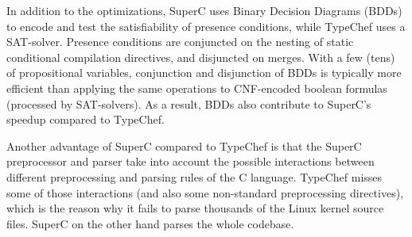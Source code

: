 \documentclass[11pt]{article}
\begin{document}
In addition to the optimizations, SuperC uses Binary Decision Diagrams (BDDs) to encode and test the satisfiability of presence conditions, while TypeChef uses a SAT-solver. Presence conditions are conjuncted on the nesting of static conditional compilation directives, and disjuncted on merges. With a few (tens) of propositional variables, conjunction and disjunction of BDDs is typically more efficient than applying the same operations to CNF-encoded boolean formulas (processed by SAT-solvers). As a result, BDDs also contribute to SuperC's speedup compared to TypeChef.

Another advantage of SuperC compared to TypeChef is that the SuperC preprocessor and parser take into account the possible interactions between different preprocessing and parsing rules of the C language. TypeChef misses some of those interactions (and also some non-standard preprocessing directives), which is the reason why it fails to parse thousands of the Linux kernel source files. SuperC on the other hand parses the whole codebase.


 
\end{document}
